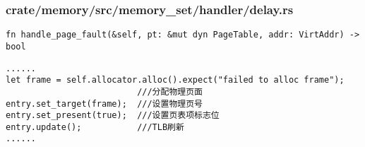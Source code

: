 % 
\begin{frame}   
	\frametitle{crate/memory/src/memory\_set/handler/delay.rs}
\begin{verbatim}
fn handle_page_fault(&self, pt: &mut dyn PageTable, addr: VirtAddr) -> bool
\end{verbatim}
\begin{block}{}
\begin{verbatim}
......
let frame = self.allocator.alloc().expect("failed to alloc frame");
                          ///分配物理页面
entry.set_target(frame);  ///设置物理页号
entry.set_present(true);  ///设置页表项标志位
entry.update();           ///TLB刷新
......
\end{verbatim}
\end{block}
\end{frame}

